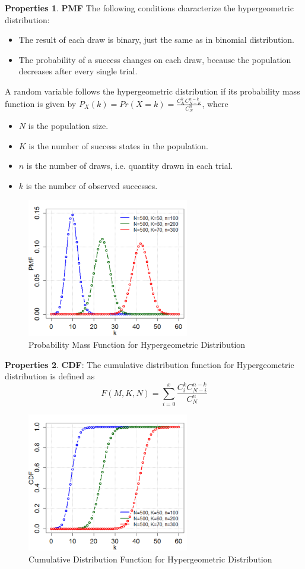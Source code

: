 \documentclass{article}
\theoremstyle{definition}
\newtheorem{prop}{Properties}[section]
\begin{document}
\begin{prop}
\textbf{PMF} The following conditions characterize the hypergeometric distribution:
\begin{itemize}
    \item The result of each draw is binary, just the same as in binomial distribution.
    \item The probability of a success changes on each draw, because the population decreases after every single trial.
\end{itemize}

A random variable follows the hypergeometric distribution if its probability mass function is given by $P_X(k)=Pr(X=k)=\frac{C_K^{k}C_{N-K}^{n-k}}{C_N^n}$, where \begin{itemize}
    \item $N$ is the population size.
    \item $K$ is the number of success states in the population.
    \item $n$ is the number of draws, i.e. quantity drawn in each trial.
    \item $k$ is the number of observed successes.
\end{itemize}
\begin{figure}[h]
\caption{Probability Mass Function for Hypergeometric Distribution}
\centering
\includegraphics[width=200pt]{Statistics/images/hyper_geometric_pmf.pdf}
\end{figure}
\end{prop}

\begin{prop}
\textbf{CDF}: The cumulative distribution function for Hypergeometric distribution is defined as $$F(M,K,N)=\sum_{i=0}^{x}\frac{C_i^{k}C_{N-i}^{n-k}}{C_N^n}$$
\begin{figure}[h]
\caption{Cumulative Distribution Function for Hypergeometric Distribution}
\centering
\includegraphics[width=200pt]{Statistics/images/hyper_geometric_cdf.pdf}
\end{figure}
\end{prop}
\end{document}
